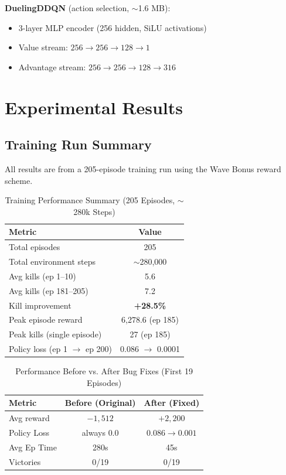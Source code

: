 \documentclass[conference]{IEEEtran}
\begin{document}
\textbf{DuelingDDQN} (action selection, $\sim$1.6 MB):
\begin{itemize}[leftmargin=*,nosep]
    \item 3-layer MLP encoder (256 hidden, SiLU activations)
    \item Value stream: $256 \to 256 \to 128 \to 1$
    \item Advantage stream: $256 \to 256 \to 128 \to 316$
\end{itemize}

\section{Experimental Results}

\subsection{Training Run Summary}
All results are from a 205-episode training run using the Wave Bonus reward scheme. 

\begin{table}[htbp]
\centering
\caption{Training Performance Summary (205 Episodes, $\sim$280k Steps)}
\label{tab:results}
\begin{tabular}{@{}lc@{}}
\toprule
\textbf{Metric} & \textbf{Value} \\
\midrule
Total episodes & 205 \\
Total environment steps & $\sim$280,000 \\
Avg kills (ep 1--10) & 5.6 \\
Avg kills (ep 181--205) & 7.2 \\
Kill improvement & \textbf{+28.5\%} \\
Peak episode reward & 6,278.6 (ep 185) \\
Peak kills (single episode) & 27 (ep 185) \\
Policy loss (ep 1 $\to$ ep 200) & 0.086 $\to$ 0.0001 \\
\bottomrule
\end{tabular}
\end{table}

\begin{table}[htbp]
\centering
\caption{Performance Before vs. After Bug Fixes (First 19 Episodes)}
\label{tab:before_after}
\begin{tabular}{@{}lcc@{}}
\toprule
\textbf{Metric} & \textbf{Before (Original)} & \textbf{After (Fixed)} \\
\midrule
Avg reward & $-1,512$ & $+2,200$ \\
Policy Loss & always $0.0$ & $0.086 \to 0.001$ \\
Avg Ep Time & 280s & 45s \\
Victories & 0/19 & 0/19 \\
\bottomrule
\end{tabular}
\end{table}
\end{document}
